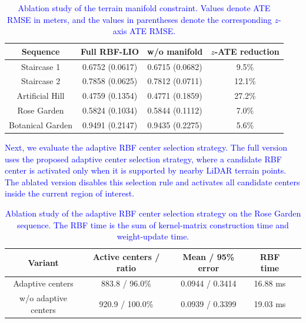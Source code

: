 \documentclass[journal,twoside,web]{ieeecolor}
\newcommand{\cs}[1]{\textcolor{blue}{#1}}
\begin{document}
\begin{table}[!t]
\centering
\caption{\cs{Ablation study of the terrain manifold constraint. Values denote ATE RMSE in meters, and the values in parentheses denote the corresponding $z$-axis ATE RMSE.}}
\label{tab:ablation_manifold}
\footnotesize
\renewcommand{\arraystretch}{1.15}
\setlength{\tabcolsep}{3.0pt}
\begin{tabular}{|c|c|c|c|}
\hline
Sequence & Full RBF-LIO & w/o manifold & $z$-ATE reduction \\
\hline
Staircase 1 & 0.6752 (0.0617) & 0.6715 (0.0682) & 9.5\% \\

Staircase 2 & 0.7858 (0.0625) & 0.7812 (0.0711) & 12.1\% \\

Artificial Hill & 0.4759 (0.1354) & 0.4771 (0.1859) & 27.2\% \\

Rose Garden & 0.5824 (0.1034) & 0.5844 (0.1112) & 7.0\% \\

Botanical Garden & 0.9491 (0.2147) & 0.9435 (0.2275) & 5.6\% \\
\hline
\end{tabular}
\renewcommand{\arraystretch}{1.0}
\end{table}



\cs{Next, we evaluate the adaptive RBF center selection strategy. The full version uses the proposed adaptive center selection strategy, where a candidate RBF center is activated only when it is supported by nearby LiDAR terrain points. The ablated version disables this selection rule and activates all candidate centers inside the current region of interest.}

\begin{table}[!t]
\centering
\caption{\cs{Ablation study of the adaptive RBF center selection strategy on the Rose Garden sequence. The RBF time is the sum of kernel-matrix construction time and weight-update time.}}
\label{tab:ablation_center_selection}
\footnotesize
\renewcommand{\arraystretch}{1.15}
\setlength{\tabcolsep}{2.3pt}
\begin{tabular}{|c|c|c|c|c|}
\hline
Variant & Active centers / ratio & Mean / 95\% error & RBF time \\
\hline
Adaptive centers & 883.8 / 96.0\% & 0.0944 / 0.3414 & 16.88 ms \\

w/o adaptive centers & 920.9 / 100.0\% & 0.0939 / 0.3399 & 19.03 ms \\
\hline
\end{tabular}
\renewcommand{\arraystretch}{1.0}
\end{table}
\end{document}
